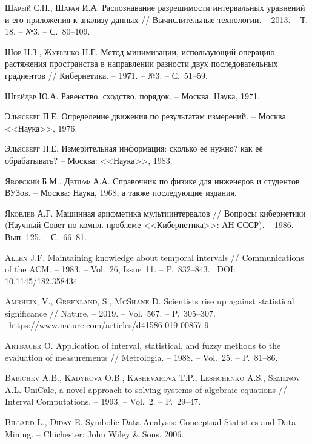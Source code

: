 \documentclass[a5paper,openany]{book}
\begin{document}
\begin{thebibliography}{999}
\textsc{Шарый С.П., Шарая И.А.} Распознавание разрешимости интервальных уравнений 
и его приложения к анализу данных // Вычислительные технологии. -- 2013. -- Т. 18. 
-- №3. -- С.~80--109. 
  
\textsc{Шор Н.З., Журбенко Н.Г.} Метод минимизации, использующий операцию растяжения 
пространства в направлении разности двух последовательных градиентов // Кибернетика. 
-- 1971. -- №3. -- С.~51--59. 
  
\textsc{Шрейдер Ю.А.} Равенство, сходство, порядок. -- Москва: Наука, 1971. 
   
\textsc{Эльясберг П.Е.} Определение движения по результатам измерений. -- Москва: 
<<Наука>>, 1976. 
  
\textsc{Эльясберг П.Е.} Измерительная информация: сколько её нужно? как её обрабатывать? 
-- Москва: <<Наука>>, 1983. 
  
\textsc{Яворский Б.М., Детлаф А.А.} Справочник по физике для инженеров и студентов ВУЗов. 
-- Москва: Наука, 1968, а также последующие издания. 
  
\textsc{Яковлев А.Г.} Машинная арифметика мультиинтервалов // Вопросы кибернетики
(Научный Совет по компл. проблеме <<Кибернетика>>: АН СССР). -- 1986. – Вып. 125. 
-- С.~66--81. 
  
\textsc{Allen J.F.} Maintaining knowledge about temporal intervals // Communications 
of the ACM. -- 1983. -- Vol.~26, Issue~11. -- P.~832--843. \  DOI: 10.1145/182.358434 
  
\textsc{Amrhein, V., Greenland, S., McShane D.} Scientists rise up against 
statistical significance // Nature. -- 2019. -- Vol.~567. -- P.~305--307. \  
\url{https://www.nature.com/articles/d41586-019-00857-9}
  
\textsc{Artbauer O.} Application of interval, statistical, and fuzzy methods 
to the evaluation of measurements // Metrologia. -- 1988. -- Vol.~25. -- P.~81--86. 
 
\textsc{Babichev A.B., Kadyrova O.B., Kashevarova T.P., Leshchenko A.S., Semenov A.L.} 
UniCalc, a novel approach to solving systems of algebraic equations // Interval 
Computations. -- 1993. -- Vol.~2. -- P.~29--47.  
  
\textsc{Billard L., Diday E.} Symbolic Data Analysis: Conceptual Statistics 
and Data Mining. -- Chichester: John Wiley \& Sons, 2006. 


\end{thebibliography}
\end{document}
